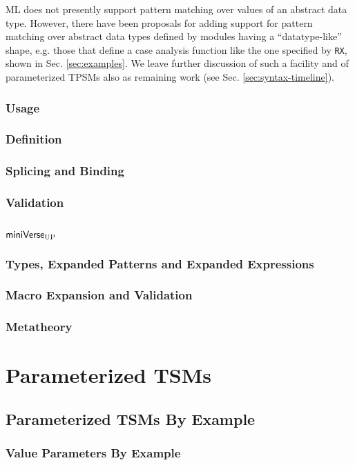 ML does not presently support pattern matching over values of an abstract data type. However, there have been proposals for adding support for pattern matching over abstract data types defined by modules having a ``datatype-like'' shape, e.g. those that define a case analysis function like the one specified by \lstinline{RX}, shown in Sec. \ref{sec:examples}. We leave further discussion of such a facility and of parameterized TPSMs also as remaining work (see Sec. \ref{sec:syntax-timeline}). 

\subsection{Usage}
\subsection{Definition}
\subsection{Splicing and Binding}
\subsection{Validation}

\section{$\mathsf{miniVerse}_\text{UP}$}
\subsection{Types, Expanded Patterns and Expanded Expressions}
\subsection{Macro Expansion and Validation}
\subsection{Metatheory}

\chapter{Parameterized TSMs}\label{sec:tsms-parameterized}
\section{Parameterized TSMs By Example}
\subsection{Value Parameters By Example}
